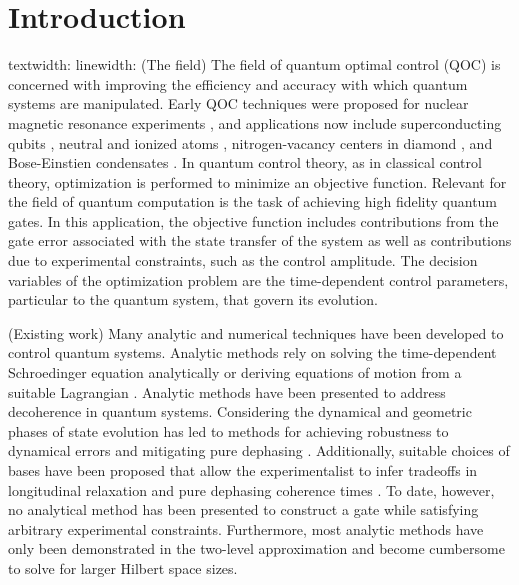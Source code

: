 \documentclass[
  amsfonts,
  amsmath,
  tbtags,
  amssymb,
  aps,
  nobibnotes,
  twocolumn,
]{revtex4-2}
\begin{document}
\section{Introduction}
textwidth: \prntlen{\textwidth}
linewidth: \prntlen{\linewidth}
(The field) The field of quantum optimal control (QOC) is concerned
with improving the efficiency and accuracy with which quantum systems
are manipulated.
Early QOC techniques were proposed for nuclear magnetic resonance experiments
\cite{khaneja2005optimal}, and applications now include superconducting
qubits \cite{heeres2017implementing,
  leng2019robust, leung2017speedup, xu2020nonadiabatic},
neutral and ionized atoms \cite{van2016optimal}, nitrogen-vacancy centers in
diamond \cite{rembold2020introduction}, and Bose-Einstien condensates
\cite{sorensen2018quantum}.
In quantum control theory, as in classical control theory,
optimization is performed
to minimize an objective function. Relevant for the field
of quantum computation is the task of achieving high fidelity quantum gates.
In this application, the objective function includes contributions from the
gate error associated with the state transfer of the system as well as contributions
due to experimental constraints, such as the control amplitude.
The decision variables of the optimization problem are the time-dependent control
parameters, particular to the quantum system, that govern its evolution.

(Existing work) Many analytic and numerical techniques have been developed to control
quantum systems. Analytic methods rely on solving the time-dependent
Schroedinger equation analytically or deriving equations of motion
from a suitable Lagrangian \cite{zhang2020universal, huang2020engineering, han2020experimental,
  xu2020nonadiabatic, carlini2005quantum}. Analytic methods
have been presented to address decoherence in quantum systems.
Considering the dynamical and geometric phases of state
evolution has led to methods for achieving
robustness to dynamical errors and mitigating pure dephasing
\cite{xu2020nonadiabatic, han2020experimental, merrill2014progress}.
Additionally, suitable choices of bases have been proposed that
allow the experimentalist to infer tradeoffs in longitudinal relaxation
and pure dephasing coherence times \cite{huang2020engineering}.
To date, however, no analytical method has been presented
to construct a gate while satisfying arbitrary experimental
constraints. Furthermore, most analytic methods have only
been demonstrated in the two-level approximation and become
cumbersome to solve for larger Hilbert space sizes.
\end{document}

